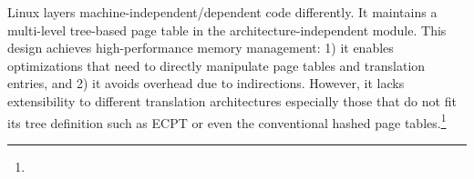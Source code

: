 
Linux layers machine-independent/dependent code differently.
It maintains a multi-level tree-based page table in the architecture-independent module.
This design achieves high-performance memory management:
	1) it enables optimizations that need to directly 
	manipulate page tables and translation entries, %
	and 2) it avoids overhead due to indirections.
However, it lacks extensibility to different translation architectures especially those
	that do not fit its tree definition such as ECPT or even the conventional hashed page tables.\footnote{
}




